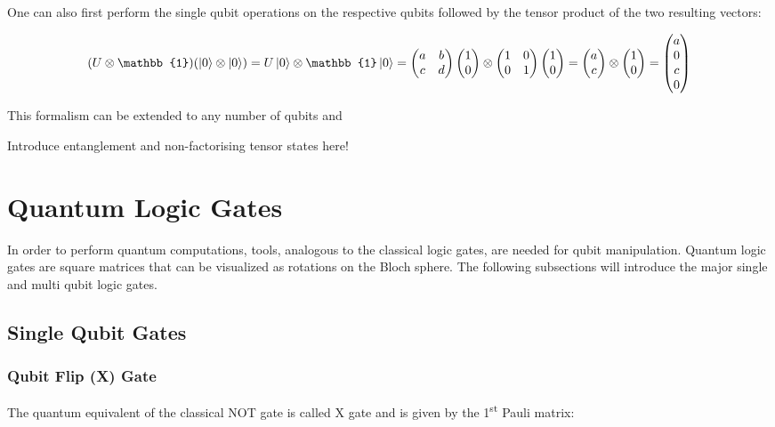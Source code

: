 One can also first perform the single qubit operations on the respective qubits followed by the tensor product of the two resulting vectors:

\begin{equation}
\label{equ:2qubitlineartransform2}
(U \otimes \mathbb{1})(\ket{0} \otimes \ket{0})= U\ket{0} \otimes \mathbb{1}\ket{0} = \begin{pmatrix}
 a & b \\ 
 c & d
 \end{pmatrix} \colvec{1\\0} \otimes \begin{pmatrix}
 1 & 0 \\ 
 0 & 1
 \end{pmatrix} \colvec{1\\0} = \colvec{a\\c} \otimes \colvec{1\\0} = \colvec{a\\0\\c\\0}
\end{equation}

This formalism can be extended to any number of qubits and 

Introduce entanglement and non-factorising tensor states here!



\section{Quantum Logic Gates}
\label{subsec:quantumlogicgates}
In order to perform quantum computations, tools, analogous to the classical logic gates, are needed for qubit manipulation. Quantum logic gates are square matrices that can be visualized as rotations on the Bloch sphere. The following subsections will introduce the major single and multi qubit logic gates.

\subsection{Single Qubit Gates}
\label{subsubsec:singlequbitgates}



\subsubsection{Qubit Flip (X) Gate}
\label{subsubsubsec:xgate}

The quantum equivalent of the classical NOT gate is called X gate and is given by the 1\textsuperscript{st} Pauli matrix:

